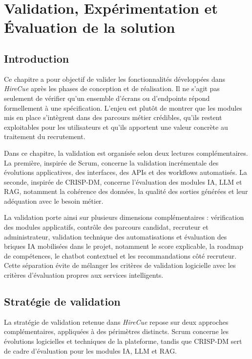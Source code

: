 \chapter{Validation, Exp\'erimentation et \'Evaluation de la solution}

\section{Introduction}

Ce chapitre a pour objectif de valider les fonctionnalités développées dans \textit{HireCue} après les phases de conception et de réalisation. Il ne s'agit pas seulement de vérifier qu'un ensemble d'écrans ou d'endpoints répond formellement à une spécification. L'enjeu est plutôt de montrer que les modules mis en place s'intègrent dans des parcours métier crédibles, qu'ils restent exploitables pour les utilisateurs et qu'ils apportent une valeur concrète au traitement du recrutement.

Dans ce chapitre, la validation est organisée selon deux lectures complémentaires. La première, inspirée de Scrum, concerne la validation incrémentale des évolutions applicatives, des interfaces, des APIs et des workflows automatisés. La seconde, inspirée de CRISP-DM, concerne l'évaluation des modules IA, LLM et RAG, notamment la cohérence des données, la qualité des sorties générées et leur adéquation avec le besoin métier.

La validation porte ainsi sur plusieurs dimensions complémentaires : vérification des modules applicatifs, contrôle des parcours candidat, recruteur et administrateur, validation technique des automatisations et évaluation des briques IA mobilisées dans le projet, notamment le score explicable, la roadmap de compétences, le chatbot contextuel et les recommandations côté recruteur. Cette séparation évite de mélanger les critères de validation logicielle avec les critères d'évaluation propres aux services intelligents.

\section{Stratégie de validation}

La stratégie de validation retenue dans \textit{HireCue} repose sur deux approches complémentaires, appliquées à des périmètres distincts. Scrum concerne les évolutions logicielles et techniques de la plateforme, tandis que CRISP-DM sert de cadre d'évaluation pour les modules IA, LLM et RAG.


